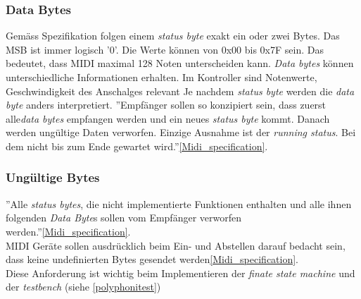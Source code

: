 \subsubsection*{Data Bytes}
Gemäss Spezifikation folgen einem \textit{status byte} exakt ein oder zwei Bytes. Das MSB ist immer logisch '0'. Die Werte können von 0x00 bis 0x7F sein. Das bedeutet, dass MIDI maximal 128 Noten unterscheiden kann.
\newline
\newline
\textit{Data bytes} können unterschiedliche Informationen erhalten. Im Kontroller sind Notenwerte, Geschwindigkeit des Anschalges relevant
\newline
\newline
Je nachdem \textit{status byte} werden die \textit{data byte} anders interpretiert. 
\newline
\newline
''Empfänger sollen so konzipiert sein, dass zuerst alle\textit{data bytes} empfangen werden und ein neues \textit{status byte} kommt. Danach werden ungültige Daten verworfen. Einzige Ausnahme ist der \textit{running status}. Bei dem nicht bis zum Ende gewartet wird.''\ref{Midi_specification}.\\

\subsubsection*{Ungültige Bytes}
''Alle \textit{status bytes}, die nicht implementierte Funktionen enthalten und alle ihnen folgenden \textit{Data Byte}s sollen vom Empfänger verworfen werden.''\ref{Midi_specification}.\\ MIDI Geräte sollen ausdrücklich beim Ein- und Abstellen darauf bedacht sein, dass keine undefinierten Bytes gesendet werden\ref{Midi_specification}.\\
Diese Anforderung ist wichtig beim Implementieren der \textit{finate state machine} und der \textit{testbench} (siehe \ref{polyphonitest}) \\

